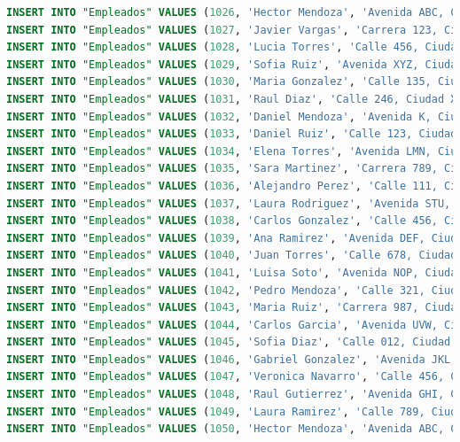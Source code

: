\documentclass[12pt]{article}
\begin{document}
\begin{lstlisting}[language=SQL]
INSERT INTO "Empleados" VALUES (1026, 'Hector Mendoza', 'Avenida ABC, Ciudad A', '555-0000', 'Mecanico');
INSERT INTO "Empleados" VALUES (1027, 'Javier Vargas', 'Carrera 123, Ciudad XYZ', '555-1111', 'Promotor');
INSERT INTO "Empleados" VALUES (1028, 'Lucia Torres', 'Calle 456, Ciudad XYZ', '555-2222', 'Promotor');
INSERT INTO "Empleados" VALUES (1029, 'Sofia Ruiz', 'Avenida XYZ, Ciudad P', '888877777', 'Promotor');
INSERT INTO "Empleados" VALUES (1030, 'Maria Gonzalez', 'Calle 135, Ciudad A', '555-3333', 'Electromecanico');
INSERT INTO "Empleados" VALUES (1031, 'Raul Diaz', 'Calle 246, Ciudad XYZ', '555-4444', 'Gerente');
INSERT INTO "Empleados" VALUES (1032, 'Daniel Mendoza', 'Avenida K, Ciudad A', '555-5555', 'Asesor');
INSERT INTO "Empleados" VALUES (1033, 'Daniel Ruiz', 'Calle 123, Ciudad XYZ', '555-6666', 'Mecanico');
INSERT INTO "Empleados" VALUES (1034, 'Elena Torres', 'Avenida LMN, Ciudad XYZ', '555-7777', 'Promotor');
INSERT INTO "Empleados" VALUES (1035, 'Sara Martinez', 'Carrera 789, Ciudad P', '888888888', 'Promotor');
INSERT INTO "Empleados" VALUES (1036, 'Alejandro Perez', 'Calle 111, Ciudad XYZ', '555-0000', 'Promotor');
INSERT INTO "Empleados" VALUES (1037, 'Laura Rodriguez', 'Avenida STU, Ciudad A', '555-1234', 'Electromecanico');
INSERT INTO "Empleados" VALUES (1038, 'Carlos Gonzalez', 'Calle 456, Ciudad XYZ', '555-9876', 'Gerente');
INSERT INTO "Empleados" VALUES (1039, 'Ana Ramirez', 'Avenida DEF, Ciudad XYZ', '555-2345', 'Asesor');
INSERT INTO "Empleados" VALUES (1040, 'Juan Torres', 'Calle 678, Ciudad A', '555-3456', 'Mecanico');
INSERT INTO "Empleados" VALUES (1041, 'Luisa Soto', 'Avenida NOP, Ciudad XYZ', '555-4567', 'Promotor');
INSERT INTO "Empleados" VALUES (1042, 'Pedro Mendoza', 'Calle 321, Ciudad A', '555-5678', 'Promotor');
INSERT INTO "Empleados" VALUES (1043, 'Maria Ruiz', 'Carrera 987, Ciudad XYZ', '555-6789', 'Promotor');
INSERT INTO "Empleados" VALUES (1044, 'Carlos Garcia', 'Avenida UVW, Ciudad P', '555-7890', 'Promotor');
INSERT INTO "Empleados" VALUES (1045, 'Sofia Diaz', 'Calle 012, Ciudad XYZ', '555-8901', 'Electromecanico');
INSERT INTO "Empleados" VALUES (1046, 'Gabriel Gonzalez', 'Avenida JKL, Ciudad A', '555-9012', 'Gerente');
INSERT INTO "Empleados" VALUES (1047, 'Veronica Navarro', 'Calle 456, Ciudad XYZ', '555-0123', 'Asesor');
INSERT INTO "Empleados" VALUES (1048, 'Raul Gutierrez', 'Avenida GHI, Ciudad XYZ', '555-1234', 'Mecanico');
INSERT INTO "Empleados" VALUES (1049, 'Laura Ramirez', 'Calle 789, Ciudad A', '555-2345', 'Promotor');
INSERT INTO "Empleados" VALUES (1050, 'Hector Mendoza', 'Avenida ABC, Ciudad XYZ', '555-3456', 'Promotor');

\end{lstlisting}
\end{document}
